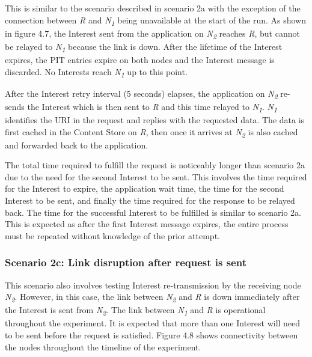 \documentclass[a4paper,12pt]{report}      %
\begin{document}
This is similar to the scenario described in scenario 2a with the exception of the connection between 
 \emph{R} and \emph{N\textsubscript{1}} being unavailable at the start of the run. As shown in figure 4.7, the Interest sent from the application
on \emph{N\textsubscript{2}} reaches \emph{R}, but cannot be relayed to \emph{N\textsubscript{1}} because the link is down. After
the lifetime of the Interest expires, the PIT entries expire on both nodes and the Interest message is
discarded. No Interests reach \emph{N\textsubscript{1}} up to this point.

After the Interest retry interval (5 seconds) elapses, the application on \emph{N\textsubscript{2}} re-sends the Interest
which is then sent to \emph{R} and this time relayed to \emph{N\textsubscript{1}}. \emph{N\textsubscript{1}} 
identifies the URI in the request and replies with the requested data. The data is first cached in the 
Content Store on \emph{R}, then once it arrives at \emph{N\textsubscript{2}} is also cached and forwarded back to the application.

The total time required to fulfill the request is noticeably longer than scenario 2a due to the need for
the second Interest to be sent. This involves the time required for the Interest to expire, the application wait time, the time for the second Interest to be sent, and finally the time required for the response to be relayed back. The time for the successful Interest to be fulfilled is similar to scenario 2a. This is expected as after the first Interest message expires, the entire process must be repeated without knowledge of the prior attempt. 

\subsubsection{Scenario 2c: Link disruption after request is sent}

This scenario also involves testing Interest re-transmission by the receiving node \emph{N\textsubscript{2}}. However, in
this case, the link between \emph{N\textsubscript{2}} and \emph{R} is down immediately after the Interest is sent
from \emph{N\textsubscript{2}}. The link between \emph{N\textsubscript{1}} and \emph{R} is operational throughout the experiment. It is expected that more than one Interest will need to be sent before the request is satisfied. Figure 4.8 shows connectivity between the nodes throughout the timeline of the experiment.
\end{document}
